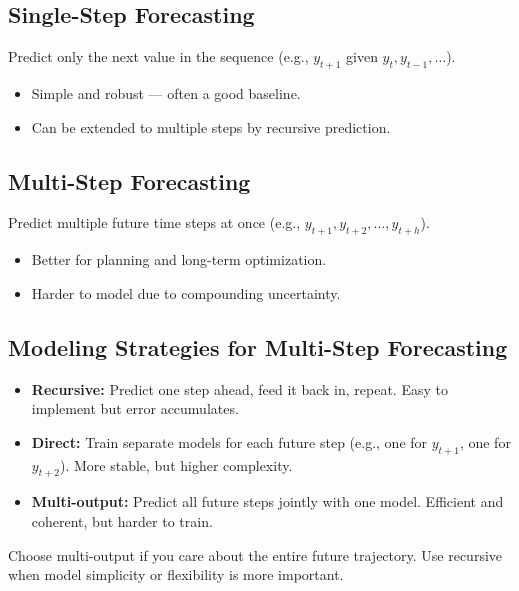 \documentclass[12pt,openany, draft]{book}
\begin{document}
\subsection*{Single-Step Forecasting}

Predict only the next value in the sequence (e.g., $y_{t+1}$ given $y_t, y_{t-1}, \dots$).

\begin{itemize}
    \item Simple and robust — often a good baseline.
    \item Can be extended to multiple steps by recursive prediction.
\end{itemize}


\subsection*{Multi-Step Forecasting}

Predict multiple future time steps at once (e.g., $y_{t+1}, y_{t+2}, \dots, y_{t+h}$).

\begin{itemize}
    \item Better for planning and long-term optimization.
    \item Harder to model due to compounding uncertainty.
\end{itemize}


\subsection*{Modeling Strategies for Multi-Step Forecasting}

\begin{itemize}
    \item \textbf{Recursive:} Predict one step ahead, feed it back in, repeat. Easy to implement but error accumulates.
    \item \textbf{Direct:} Train separate models for each future step (e.g., one for $y_{t+1}$, one for $y_{t+2}$). More stable, but higher complexity.
    \item \textbf{Multi-output:} Predict all future steps jointly with one model. Efficient and coherent, but harder to train.
\end{itemize}

\begin{notebox}
Choose multi-output if you care about the entire future trajectory. Use recursive when model simplicity or flexibility is more important.
\end{notebox}
\end{document}
